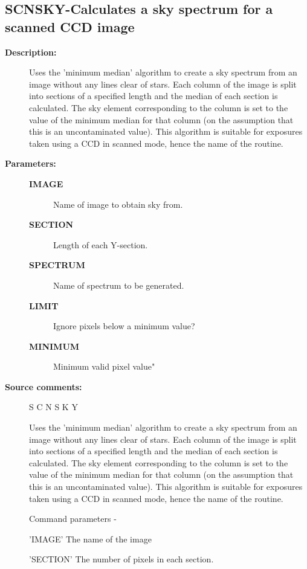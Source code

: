 \subsection{SCNSKY-\label{SCNSKY}Calculates a sky spectrum for a scanned CCD image}
\begin{description}

\item [\textbf{Description:}]
 Uses the 'minimum median' algorithm to create a sky spectrum
 from an image without any lines clear of stars.  Each column
 of the image is split into sections of a specified length and
 the median of each section is calculated.  The sky element
 corresponding to the column is set to the value of the minimum
 median for that column (on the assumption that this is an
 uncontaminated value).  This algorithm is suitable for exposures
 taken using a CCD in scanned mode, hence the name of the routine.

\item [\textbf{Parameters:}]
\begin{description}
\item [\textbf{IMAGE}]
 Name of image to obtain sky from.
\item [\textbf{SECTION}]
 Length of each Y-section.
\item [\textbf{SPECTRUM}]
 Name of spectrum to be generated.
\item [\textbf{LIMIT}]
 Ignore pixels below a minimum value?
\item [\textbf{MINIMUM}]
 Minimum valid pixel value"
\end{description}

\item [\textbf{Source comments:}]
\begin{terminalv}
 S C N S K Y

 Uses the 'minimum median' algorithm to create a sky spectrum
 from an image without any lines clear of stars.  Each column
 of the image is split into sections of a specified length and
 the median of each section is calculated.  The sky element
 corresponding to the column is set to the value of the minimum
 median for that column (on the assumption that this is an
 uncontaminated value).  This algorithm is suitable for exposures
 taken using a CCD in scanned mode, hence the name of the routine.

 Command parameters -

 'IMAGE'    The name of the image

 'SECTION'  The number of pixels in each section.


\end{terminalv}
\end{description}
